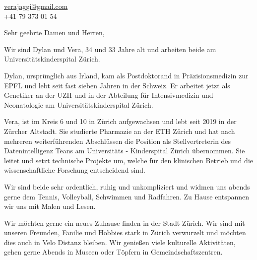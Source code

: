 \documentclass[11pt, a4paper]{letter}
\begin{document}
 
\begin{letter}{} 

\begin{minipage}[t]{0.48\textwidth}
\raggedright
\end{minipage}
\hfill
\begin{minipage}[t]{0.48\textwidth}
\raggedleft
\href{mailto:verajaggi@gmail.com}{verajaggi@gmail.com} \\
+41 79 373 01 54
\end{minipage}

\opening{Sehr geehrte Damen und Herren,}

Wir sind Dylan und Vera, 34 und 33 Jahre alt und arbeiten beide am Universitätskinderspital Zürich.


Dylan, ursprünglich aus Irland, kam als Postdoktorand in Präzisionsmedizin zur EPFL und lebt seit fast sieben Jahren in der Schweiz. 
Er arbeitet jetzt als Genetiker an der UZH und in der Abteilung für Intensivmedizin und Neonatologie am Universitätskinderspital Zürich.

Vera, ist im Kreis 6 und 10 in Zürich aufgewachsen und lebt seit 2019 in der Zürcher Altstadt. Sie studierte Pharmazie an der ETH Zürich und hat nach mehreren weiterführenden Abschlüssen die Position als Stellvertreterin des Datenintelligenz Teans am Universitäts - Kinderspital Zürich übernommen. Sie leitet und setzt technische Projekte um, welche für den klinischen Betrieb und die wissenschaftliche Forschung entscheidend sind.

Wir sind beide sehr ordentlich, ruhig und unkompliziert und widmen uns abends gerne dem Tennis, Volleyball, Schwimmen und Radfahren. Zu Hause entspannen wir uns mit Malen und Lesen.

Wir möchten gerne ein neues Zuhause finden in der Stadt Zürich. 
Wir sind mit unseren Freunden, Fanilie und Hobbies stark in Zürich verwurzelt und möchten dies auch in Velo Distanz bleiben.
Wir genießen viele kulturelle Aktivitäten, gehen gerne Abends in Museen oder Töpfern in Gemeindschaftszentren. 


\end{letter}
\end{document}
